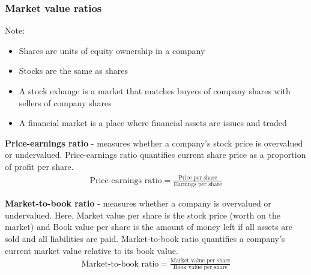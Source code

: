 \subsubsection{Market value ratios}
Note: 
\begin{itemize}
    \item Shares are units of equity ownership in a company
    \item Stocks are the same as shares
    \item A stock exhange is a market that matches buyers of company shares with sellers of company shares
    \item A financial market is a place where financial assets are issues and traded
\end{itemize}
\textbf{Price-earnings ratio} - measures whether a company's stock price is overvalued or undervalued. Price-earnings ratio quantifies current share price as a proportion of profit per share.
\begin{gather}
    \textrm{Price-earnings ratio} = \frac{\textrm{Price per share}}{\textrm{Earnings per share}}
\end{gather}

\textbf{Market-to-book ratio} - measures whether a company is overvalued or undervalued. Here, Market value per share is the stock price (worth on the market) and Book value per share is the amount of money left if all assets are sold and all liabilities are paid. Market-to-book ratio quantifies a company's current market value relative to its book value.
\begin{gather}
    \textrm{Market-to-book ratio} = \frac{\textrm{Market value per share}}{\textrm{Book value per share}}
\end{gather}